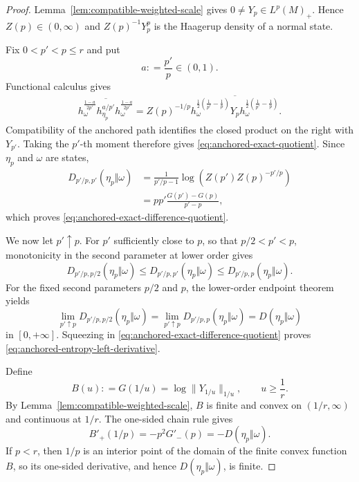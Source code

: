 \documentclass[12pt]{article}
\numberwithin{equation}{section}
\theoremstyle{definition}
\theoremstyle{remark}
\newcommand{\?}{\overset{?}{=}}
\newcommand{\defeq}{\mathrel{\mathop:}=}
\begin{document}
\begin{proof}
Lemma~\ref{lem:compatible-weighted-scale} gives
$0\ne Y_p\in L^p(M)_+$.  Hence
$Z(p)\in(0,\infty)$ and $Z(p)^{-1}Y_p^p$ is the Haagerup density of a
normal state.

Fix $0<p'<p\leq r$ and put
\[
  a\defeq\frac{p'}p\in(0,1).
\]
Functional calculus gives
\begin{align}
  \overline{
  h_\omega^{\frac{1-a}{2p'}}
  h_{\eta_p}^{a/p'}
  h_\omega^{\frac{1-a}{2p'}}}
  =
  Z(p)^{-1/p}
  \overline{
    h_\omega^{\frac12(\frac1{p'}-\frac1p)}
    Y_p
    h_\omega^{\frac12(\frac1{p'}-\frac1p)}}.
\end{align}
Compatibility of the anchored path identifies the closed product on the
right with $Y_{p'}$.  Taking the $p'$-th moment therefore gives
\eqref{eq:anchored-exact-quotient}.  Since $\eta_p$ and $\omega$ are
states,
\begin{align}
  D_{p'/p,p'}(\eta_p\Vert\omega)
  &=
  \frac{1}{p'/p-1}
  \log\!\left(Z(p')Z(p)^{-p'/p}\right)\\
  &=
  pp'\frac{G(p')-G(p)}{p'-p},
\end{align}
which proves \eqref{eq:anchored-exact-difference-quotient}.

We now let $p'\uparrow p$.  For $p'$ sufficiently close to $p$, so that
$p/2<p'<p$, monotonicity in the second parameter at lower order
\cite[Theorem~1 (x)]{Kato:2023hlj} gives
\begin{equation}
  D_{p'/p,p/2}(\eta_p\Vert\omega)
  \leq
  D_{p'/p,p'}(\eta_p\Vert\omega)
  \leq
  D_{p'/p,p}(\eta_p\Vert\omega).
  \label{eq:anchored-varying-z-squeeze}
\end{equation}
For the fixed second parameters $p/2$ and $p$, the lower-order endpoint
theorem \cite[Theorem~6.7]{Hiai:2024qve} yields
\begin{equation}
  \lim_{p'\uparrow p}D_{p'/p,p/2}(\eta_p\Vert\omega)
  =
  \lim_{p'\uparrow p}D_{p'/p,p}(\eta_p\Vert\omega)
  =
  D(\eta_p\Vert\omega)
\end{equation}
in $[0,+\infty]$.  Squeezing in
\eqref{eq:anchored-exact-difference-quotient} proves
\eqref{eq:anchored-entropy-left-derivative}.

Define
\begin{equation}
  B(u)\defeq G(1/u)=\log\|Y_{1/u}\|_{1/u},
  \qquad u\geq\frac1r.
\end{equation}
By Lemma~\ref{lem:compatible-weighted-scale}, $B$ is finite and convex on
$(1/r,\infty)$ and continuous at $1/r$.  The one-sided chain rule gives
\begin{equation}
  B'_+(1/p)
  =
  -p^2G'_-(p)
  =
  -D(\eta_p\Vert\omega).
  \label{eq:anchored-B-derivative}
\end{equation}
If $p<r$, then $1/p$ is an interior point of the domain of the finite
convex function $B$, so its one-sided derivative, and hence
$D(\eta_p\Vert\omega)$, is finite.


\end{proof}
\end{document}
